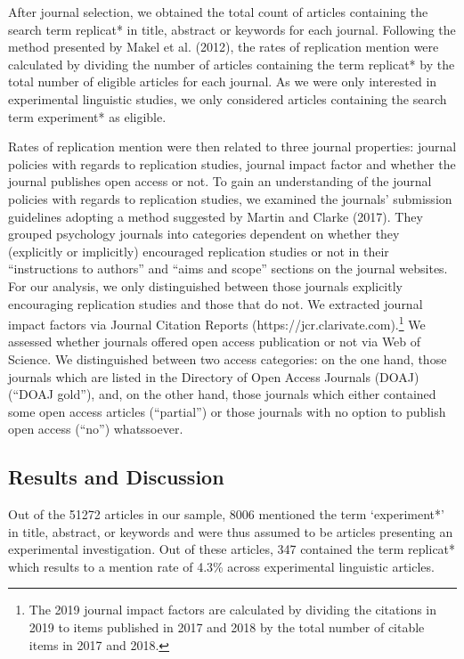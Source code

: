 \documentclass[]{elsarticle} %
\begin{document}
After journal selection, we obtained the total count of articles containing the search term replicat* in title, abstract or keywords for each journal.
Following the method presented by Makel et al. (2012), the rates of replication mention were calculated by dividing the number of articles containing the term replicat* by the total number of eligible articles for each journal. As we were only interested in experimental linguistic studies, we only considered articles containing the search term experiment* as eligible.

Rates of replication mention were then related to three journal properties: journal policies with regards to replication studies, journal impact factor and whether the journal publishes open access or not.
To gain an understanding of the journal policies with regards to replication studies, we examined the journals' submission guidelines adopting a method suggested by Martin and Clarke (2017).
They grouped psychology journals into categories dependent on whether they (explicitly or implicitly) encouraged replication studies or not in their ``instructions to authors'' and ``aims and scope'' sections on the journal websites. For our analysis, we only distinguished between those journals explicitly encouraging replication studies and those that do not.
We extracted journal impact factors via Journal Citation Reports (https://jcr.clarivate.com).\footnote{The 2019 journal impact factors are calculated by dividing the citations in 2019 to items published in 2017 and 2018 by the total number of citable items in 2017 and 2018.}
We assessed whether journals offered open access publication or not via Web of Science.
We distinguished between two access categories: on the one hand, those journals which are listed in the Directory of Open Access Journals (DOAJ) (``DOAJ gold''), and, on the other hand, those journals which either contained some open access articles (``partial'') or those journals with no option to publish open access (``no'') whatssoever.

\hypertarget{results-and-discussion}{%
\subsection{Results and Discussion}\label{results-and-discussion}}

Out of the 51272 articles in our sample, 8006 mentioned the term `experiment*' in title, abstract, or keywords and were thus assumed to be articles presenting an experimental investigation.
Out of these articles, 347 contained the term replicat* which results to a mention rate of 4.3\% across experimental linguistic articles.
\end{document}
